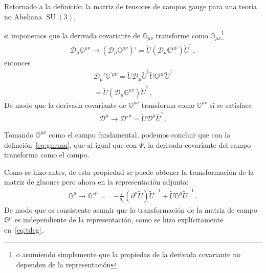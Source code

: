 Retornado a la definición la matriz de tensores de campos gauge para una teoría no Abeliana $\operatorname{SU}(3)$,
\begin{frame}
si imponemos que la derivada covariante de $\mathbb{G}_{\mu\nu}$ transforme como $\mathbb{G}_{\mu\nu}$\footnote{o asumiendo simplemente que la propiedas de la derivada covariante no dependen de la representación}
\begin{align}
  \mathcal{D}_{\mu}\mathbb{G}^{\mu\nu} \to \left(  \mathcal{D}_{\mu}\mathbb{G}^{\mu\nu}  \right)'=
    \widetilde{U} \left( \mathcal{D}_{\mu}\mathbb{G}^{\mu\nu} \right)  \widetilde{U}^{\dagger}\,,
\end{align}
entonces
\begin{align}
  \mathcal{D}_{\mu}'\mathbb{G}^{\prime \mu\nu}
  =\widetilde{U} \mathcal{D}_{\mu}\widetilde{U}^{\dagger} \widetilde{U} \mathbb{G}^{\mu\nu}  \widetilde{U}^{\dagger}\nonumber\\
  =\widetilde{U} \left(   \mathcal{D}_{\mu}  \mathbb{G}^{\mu\nu} \right) \widetilde{U}^{\dagger}\,,
\end{align}
De modo que la derivada covariante de $\mathbb{G}^{\mu\nu}$ transforma como $\mathbb{G}^{\mu\nu}$ si se satisface
\begin{align}
{\mathcal{D}}^\mu \to   {\mathcal{D}'}^\mu =\widetilde{U} {\mathcal{D}}^\mu \widetilde{U}^{\dagger}\,.
\end{align}

Tomando $\mathbb{G}^{\mu\nu}$ como el campo fundamental, podemos concluir que con la definción~\eqref{eq:gmunu}, que al igual que con $\Psi$, la derivada covariante del campo transforma como el campo. 

Como se hizo antes, de esta propiedad se puede obtener la transformación de la matriz de gluones pero ahora en la representación adjunta:
\begin{align}
 \mathbb{G}^{\mu}\to  {\mathbb{G}'}^\mu  =&-\frac{i}{g_s}(\partial^\mu \widetilde{U})\widetilde{U}^{-1}+ \widetilde{U}{\mathbb{G}}^\mu \widetilde{U}^{-1}\,.  
\end{align}
De modo que es consistente asumir que la transformación de la matriz de  campo $\mathbb{G}^{\mu}$ es independiente de la representación, como se hizo explícitamente en~\eqref{eq:tdcg}.
\end{frame}


